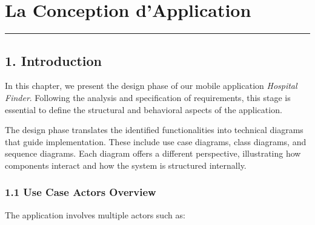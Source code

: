 \documentclass[12pt]{report}
\begin{document}
\newpage

\chapter{\textbf{La Conception d'Application}}
\rule{\linewidth}{1.5pt}


\section*{\textbf{1. Introduction}}

\noindent In this chapter, we present the design phase of our mobile application \textit{Hospital Finder}. Following the analysis and specification of requirements, this stage is essential to define the structural and behavioral aspects of the application. 

\noindent The design phase translates the identified functionalities into technical diagrams that guide implementation. These include use case diagrams, class diagrams, and sequence diagrams. Each diagram offers a different perspective, illustrating how components interact and how the system is structured internally.

\subsection*{1.1 Use Case Actors Overview}

\noindent The application involves multiple actors such as:
\end{document}
